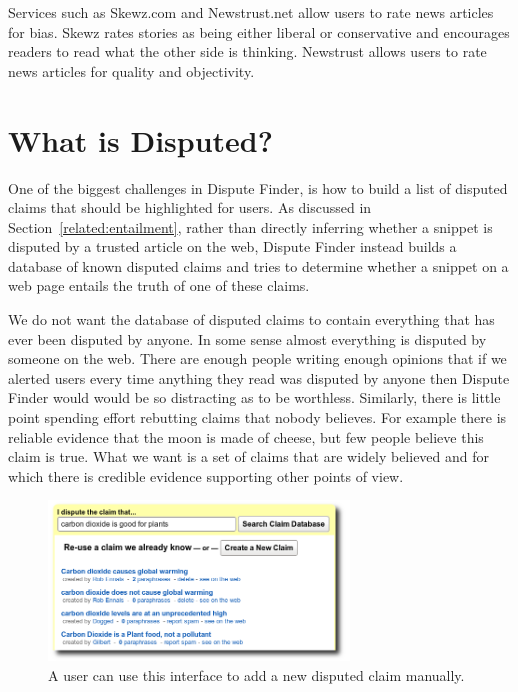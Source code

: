 \documentclass{www2010-submission}
\newcommand{\todo}[1]{}
\begin{document}
Services such as Skewz.com and Newstrust.net allow users to rate news articles for bias. Skewz rates stories as being either liberal or conservative and encourages readers to read what the other side is thinking. Newstrust allows users to rate news articles for quality and objectivity. 



\section{What is Disputed?}

One of the biggest challenges in Dispute Finder, is how to build a list of disputed claims that should be highlighted for users. As discussed in Section~\ref{related:entailment}, rather than directly inferring whether a snippet is disputed by a trusted article on the web, Dispute Finder instead builds a database of known disputed claims and tries to determine whether a snippet on a web page entails the truth of one of these claims.

\todo{We are repeating information between here and the related work section on Recognizing Textual Entailment}

We do not want the database of disputed claims to contain everything that has ever been disputed by anyone. In some sense almost everything is disputed by someone on the web. There are enough people writing enough opinions that if we alerted users every time anything they read was disputed by anyone then Dispute Finder would would be so distracting as to be worthless. Similarly, there is little point spending effort rebutting claims that nobody believes. For example there is reliable evidence that the moon is made of cheese, but few people believe this claim is true. What we want is a set of claims that are widely believed and for which there is credible evidence supporting other points of view.

\begin{figure}[tb]
	\begin{center}
	\includegraphics[width=8cm]{pictures/add_claim_list.png}
	\caption{A user can use this interface to add a new disputed claim manually.}
	\label{add_claim}
	\end{center}
\end{figure}
\end{document}
